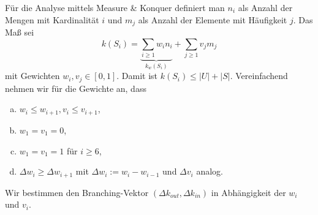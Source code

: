   Für die Analyse mittels Measure \& Konquer definiert man \(n_i\) als Anzahl der Mengen mit Kardinalität \(i\) und \(m_j\) als Anzahl der Elemente mit Häufigkeit \(j\). Das Maß sei
  \[ k(S_i) = \underbrace{ \sum_{i \geq 1} w_in_i }_{k_w(S_i)} + \sum_{j \geq 1} v_jm_j \]
  mit Gewichten \(w_i, v_j \in [0,1]\). Damit ist \(k(S_i) \leq |U| + |S|\). Vereinfachend nehmen wir für die Gewichte an, dass
  \begin{enumerate}[(a)]
   \item \(w_i \leq w_{i+1}, v_i \leq v_{i+1}\),
   \item \(w_1 = v_1 = 0\),
   \item \(w_1 = v_1 = 1\) für \(i \geq 6\),
   \item \(\Delta w_i \geq \Delta w_{i+1}\) mit \(\Delta w_i := w_i - w_{i-1}\) und \(\Delta v_i\) analog.
  \end{enumerate}
  Wir bestimmen den Branching-Vektor \( (\Delta k_{out}, \Delta k_{in}) \) in Abhängigkeit der \(w_i\) und \(v_i\).
